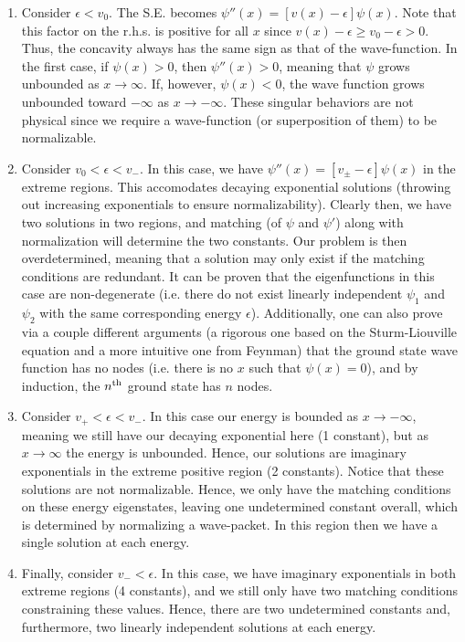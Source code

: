 \begin{enumerate}
    \item Consider $\epsilon < v_0$. The S.E. becomes $\psi''(x) = [v(x) - \epsilon] \psi(x)$. Note that this factor on the r.h.s. is positive for all $x$ since $v(x) - \epsilon \geq v_0 - \epsilon > 0$. Thus, the concavity always has the same sign as that of the wave-function. In the first case, if $\psi(x) > 0$, then $\psi''(x) > 0$, meaning that $\psi$ grows unbounded as $x \rightarrow \infty$. If, however, $\psi(x) < 0$, the wave function grows unbounded toward $-\infty$ as $x \rightarrow -\infty$. These singular behaviors are not physical since we require a wave-function (or superposition of them) to be normalizable.

    \item Consider $v_0 < \epsilon < v_{-}$. In this case, we have $\psi''(x) = [v_{\pm} - \epsilon] \psi(x)$ in the extreme regions. This accomodates decaying exponential solutions (throwing out increasing exponentials to ensure normalizability). Clearly then, we have two solutions in two regions, and matching (of $\psi$ and $\psi'$) along with normalization will determine the two constants. Our problem is then overdetermined, meaning that a solution may only exist if the matching conditions are redundant. It can be proven that the eigenfunctions in this case are non-degenerate (i.e. there do not exist linearly independent $\psi_{1}$ and $\psi_{2}$ with the same corresponding energy $\epsilon$). Additionally, one can also prove via a couple different arguments (a rigorous one based on the Sturm-Liouville equation and a more intuitive one from Feynman) that the ground state wave function has no nodes (i.e. there is no $x$ such that $\psi(x) = 0$), and by induction, the $n^{\rm th}$ ground state has $n$ nodes.

    \item Consider $v_{+} < \epsilon < v_{-}$. In this case our energy is bounded as $x \rightarrow -\infty$, meaning we still have our decaying exponential here (1 constant), but as $x \rightarrow \infty$ the energy is unbounded. Hence, our solutions are imaginary exponentials in the extreme positive region (2 constants). Notice that these solutions are not normalizable. Hence, we only have the matching conditions on these energy eigenstates, leaving one undetermined constant overall, which is determined by normalizing a wave-packet. In this region then we have a single solution at each energy.

    \item Finally, consider $v_{-} < \epsilon$. In this case, we have imaginary exponentials in both extreme regions (4 constants), and we still only have two matching conditions constraining these values. Hence, there are two undetermined constants and, furthermore, two linearly independent solutions at each energy.
\end{enumerate}

